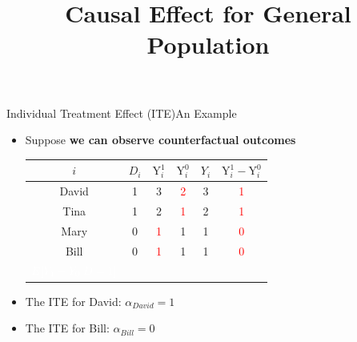 \documentclass[hyperref={pdfpagelabels=false}]{beamer}
\begin{document}
\begin{frame}{Individual Treatment Effect (ITE)}{An Example}
\begin{itemize}
\item Suppose \textbf{we can observe counterfactual outcomes}
\vspace{0.2cm} 
\begin{center}
	\begin{threeparttable}
		\centering\footnotesize
		\begin{tabular}{cccccc}
			\toprule
			$i$ & $D_i$ & $\mathrm{Y}^{1}_{i}$ & $\mathrm{Y}^{0}_{i}$ & $Y_i$ & $\mathrm{Y}^{1}_{i}-\mathrm{Y}^{0}_{i}$  \\
			\midrule
			David & 1 & 3 & \textcolor{red} 2 & 3 & \textcolor{red} 1 \\
			Tina & 1 & 2 & \textcolor{red} 1 & 2 & \textcolor{red} 1 \\
			Mary & 0 & \textcolor{red} 1 & 1 & 1 & \textcolor{red} 0 \\
			Bill & 0 & \textcolor{red} 1 & 1 & 1 & \textcolor{red} 0 \\
			\midrule
			$\color{white}E[Y_1-Y_0|D=1]$ &   &   &   &  &  \\
		\end{tabular}
	\end{threeparttable}
\end{center}

\item The ITE for David: $\alpha_{David}=1$
\vspace{0.2cm}
\item The ITE for Bill: $\alpha_{Bill}=0$


\end{itemize}
\end{frame}






\title[]  
{Causal Effect for General Population}


\author 
{}

\institute{}






\date
{}
\end{document}
